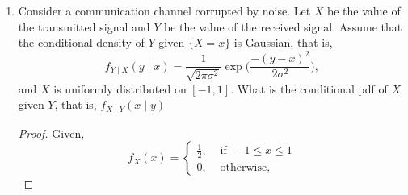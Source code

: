 \documentclass[paper=usletter, fontsize=12pt]{article}
\begin{document}
\begin{enumerate}
\begin{enumerate}
            \item Determine the joint PDF $f_{X,Y}(x,y)$.
            \begin{proof}

                Since
                \begin{align*}
                    \int_{0}^{40}ax\diff{x} & = 1\\
                    a\frac{40^2}{2} & = 1\\
                    \implies a & = \frac{1}{800}
                \end{align*}

            \end{proof}

            \item What is the probability that on a given night Alexei makes a
            positive profit at the casino?
            \begin{proof}
            \end{proof}

            \item Find the PDF of Alexei's profit $Y-X$ on a particular night,
            and also determine its expected value.
            \begin{proof}
            \end{proof}

        \end{enumerate}

        \item Consider a communication channel corrupted by noise. Let $X$ be
        the value of the transmitted signal and $Y$ be the value of the
        received signal. Assume that the conditional density of $Y$ given
        $\{X=x\}$ is Gaussian, that is,
        \begin{equation*}
            f_{Y \mid X}(y \mid x) = \frac{1}{\sqrt{2\pi\sigma^2}}\exp\bigg(\frac{-(y-x)^2}{2\sigma^2}\bigg),
        \end{equation*}
        and $X$ is uniformly distributed on $[-1,1]$. What is the conditional
        pdf of $X$ given $Y$, that is, $f_{X \mid Y}(x \mid y)$
        \begin{proof}

            Given,
            \begin{equation*}
                f_{X}(x) =
                \begin{cases}
                    \frac{1}{2}, & \text{ if } -1 \le x \le 1\\
                    0, & \text{ otherwise},
                \end{cases}
            \end{equation*}


\end{proof}
\end{enumerate}
\end{document}
